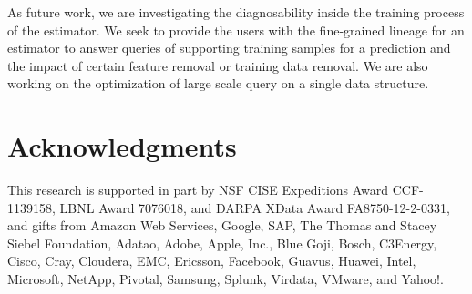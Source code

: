 \documentclass{sig-alternate}
\begin{document}
As future work, we are investigating the diagnosability inside the training process of the estimator. 
We seek to provide the users with the fine-grained lineage for an estimator to answer queries of 
supporting training samples for a prediction and the impact of certain feature removal or training data removal. 
We are also working on the optimization of large scale query on a single data structure.

\section{Acknowledgments}
This research is supported in part by NSF CISE Expeditions Award CCF-1139158, LBNL Award 7076018, and DARPA XData Award FA8750-12-2-0331, and gifts from Amazon Web Services, Google, SAP,  The Thomas and Stacey Siebel Foundation, Adatao, Adobe, Apple, Inc., Blue Goji, Bosch, C3Energy, Cisco, Cray, Cloudera, EMC, Ericsson, Facebook, Guavus, Huawei, Intel, Microsoft, NetApp, Pivotal, Samsung, Splunk, Virdata, VMware, and Yahoo!. 

%

\balance
%
%



\balancecolumns

\end{document}
